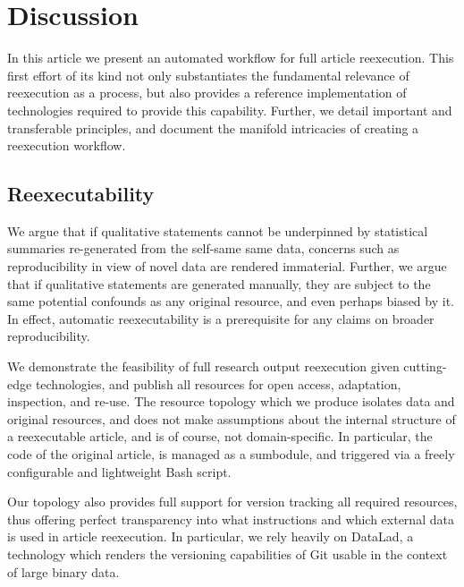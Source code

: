 \section{Discussion}

In this article we present an automated workflow for full article reexecution.
This first effort of its kind not only substantiates the fundamental relevance of reexecution as a process, but also provides a reference implementation of technologies required to provide this capability.
Further, we detail important and transferable principles, and document the manifold intricacies of creating a reexecution workflow.

\subsection{Reexecutability}
We argue that if qualitative statements cannot be underpinned by statistical summaries re-generated from the self-same same data, concerns such as reproducibility in view of novel data are rendered immaterial.
Further, we argue that if qualitative statements are generated manually, they are subject to the same potential confounds as any original resource, and even perhaps biased by it.
In effect, automatic reexecutability is a prerequisite for any claims on broader reproducibility.

We demonstrate the feasibility of full research output reexecution given cutting-edge technologies, and publish all resources for open access, adaptation, inspection, and re-use.
The resource topology which we produce isolates data and original resources, and does not make assumptions about the internal structure of a reexecutable article, and is of course, not domain-specific.
In particular, the code of the original article, is managed as a sumbodule, and triggered via a freely configurable and lightweight Bash script.

Our topology also provides full support for version tracking all required resources, thus offering perfect transparency into what instructions and which external data is used in article reexecution.
In particular, we rely heavily on DataLad, a technology which renders the versioning capabilities of Git usable in the context of large binary data.

